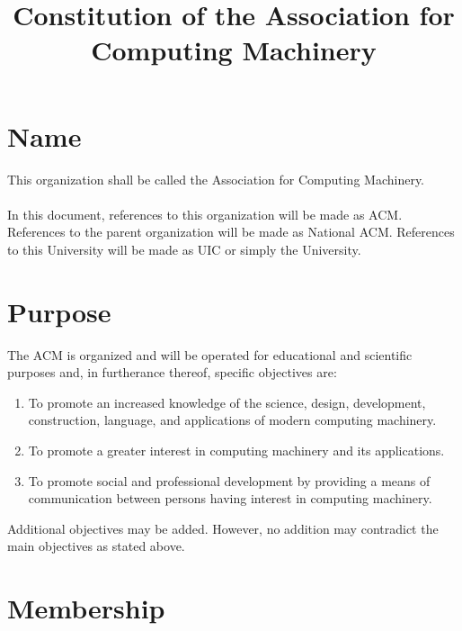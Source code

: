 \documentclass[12pt,titlepage]{article}
\begin{document}
\title{Constitution of the Association for Computing Machinery}
\maketitle

\tableofcontents

\pagebreak

\section{Name}

This organization shall be called the Association for Computing Machinery.\\
\\
In this document, references to this organization will be made as ACM. References to the parent organization will be made as National ACM. References to this University will be made as UIC or simply the University.

\section{Purpose}

The ACM is organized and will be operated for educational and scientific purposes and, in furtherance thereof, specific objectives are:
\begin{enumerate}
\item To promote an increased knowledge of the science, design, development, construction, language, and applications of modern computing machinery.
\item To promote a greater interest in computing machinery and its applications.
\item To promote social and professional development by providing a means of communication between persons having interest in computing machinery.
\end{enumerate}
Additional objectives may be added. However, no addition may contradict the main objectives as stated above.

\section{Membership}
\end{document}
